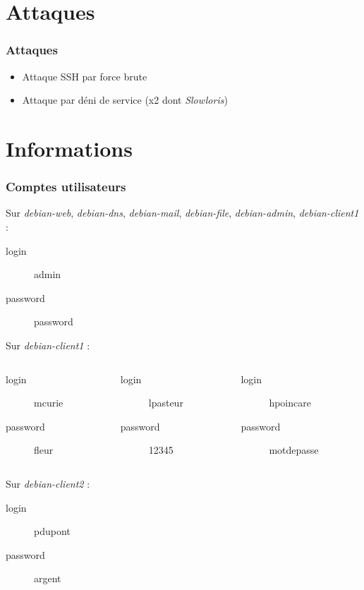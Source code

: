 \documentclass{beamer}
\begin{document}
	\section{Attaques}
		\begin{frame}
			\frametitle{Attaques}
			\begin{itemize}
				\item Attaque SSH par force brute
				\item Attaque par déni de service (x2 dont \textit{Slowloris})
			\end{itemize}
		\end{frame}
	\section{Informations}
		\begin{frame}
			\frametitle{Comptes utilisateurs}
			\begin{alertblock}{Sur \textit{debian-web}, \textit{debian-dns}, \textit{debian-mail}, \textit{debian-file}, \textit{debian-admin}, \textit{debian-client1} :}
				\begin{description}
					\item[login] admin
					\item[password] password
				\end{description}
			\end{alertblock}
			\begin{alertblock}{Sur \textit{debian-client1} :}
				\begin{columns}
					\begin{column}{.28\linewidth}
						\begin{description}
							\item[login] mcurie
							\item[password] fleur
						\end{description}
					\end{column}
					\begin{column}{.29\linewidth}
						\begin{description}
							\item[login] lpasteur
							\item[password] 12345
						\end{description}
					\end{column}
					\begin{column}{.34\linewidth}
						\begin{description}
							\item[login] hpoincare
							\item[password] motdepasse
						\end{description}
					\end{column}
				\end{columns}
			\end{alertblock}
			\begin{alertblock}{Sur \textit{debian-client2} :}
				\begin{description}
					\item[login] pdupont
					\item[password] argent
				\end{description}
			\end{alertblock}
		\end{frame}
\end{document}
